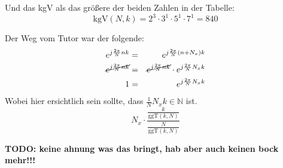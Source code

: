 \begin{uebsp}
\begin{Answer}
\begin{bsp}
Und das {\color{green}kgV} als das größere der beiden Zahlen in der Tabelle:
\[\text{kgV}(N,k)=2^3\cdot 3^1\cdot 5^1\cdot 7^1=840\]
\end{bsp}

\begin{hint}
Der Weg vom Tutor war der folgende:
\begin{eqnarray*}
e^{j\frac{2\pi}{N}nk}&=&e^{j\frac{2\pi}{N}(n+N_x)k}\\
\cancel{e^{j\frac{2\pi}{N}nk}}&=&\cancel{e^{j\frac{2\pi}{N}nk}}\cdot e^{j\frac{2\pi}{N}N_xk}\\
1&=&e^{j\frac{2\pi}{N}N_xk}
\end{eqnarray*}
Wobei hier ersichtlich sein sollte, dass $\frac{1}{N}N_xk\in\mathbb{N}$ ist.
\[N_x\cdot\frac{\frac{k}{\text{ggT}(k,N)}}{\frac{N}{\text{ggT}(k,N)}}\]

\textbf{TODO: keine ahnung was das bringt, hab aber auch keinen bock mehr!!!}
\end{hint}
\end{Answer}
\end{uebsp}
